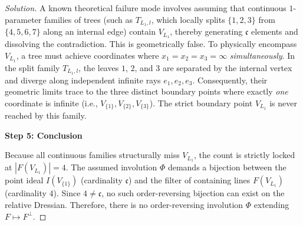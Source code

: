 \documentclass[12pt]{article}
\begin{document}
\begin{proof}[Solution]
A known theoretical failure mode involves assuming that continuous $1$-parameter families of trees (such as $T_{L_1, l}$, which locally splits $\{1,2,3\}$ from $\{4,5,6,7\}$ along an internal edge) contain $V_{L_1}$, thereby generating $\mathfrak{c}$ elements and dissolving the contradiction. This is geometrically false. To physically encompass $V_{L_1}$, a tree must achieve coordinates where $x_1=x_2=x_3=\infty$ \emph{simultaneously}. In the split family $T_{L_1, l}$, the leaves $1$, $2$, and $3$ are separated by the internal vertex and diverge along independent infinite rays $e_1, e_2, e_3$. Consequently, their geometric limits trace to the three distinct boundary points where exactly \emph{one} coordinate is infinite (i.e., $V_{\{1\}}, V_{\{2\}}, V_{\{3\}}$). The strict boundary point $V_{L_1}$ is never reached by this family.



\medskip
\noindent \textbf{Step 5: Conclusion}

Because all continuous families structurally miss $V_{L_1}$, the count is strictly locked at $|F(V_{L_1})| = 4$. The assumed involution $\Phi$ demands a bijection between the point ideal $I(V_{\{1\}})$ (cardinality $\mathfrak{c}$) and the filter of containing lines $F(V_{L_1})$ (cardinality $4$). Since $4 \neq \mathfrak{c}$, no such order-reversing bijection can exist on the relative Dressian. 
Therefore, there is no order-reversing involution $\Phi$ extending $F \mapsto F^\perp$.
\end{proof}
\end{document}
